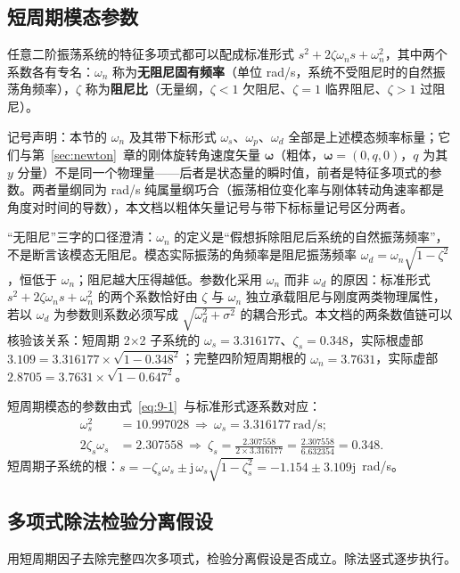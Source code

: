 \documentclass[11pt,a4paper]{ctexart}
\newcommand{\bvec}[1]{\boldsymbol{#1}}
\begin{document}
\subsection{短周期模态参数}

任意二阶振荡系统的特征多项式都可以配成标准形式 $s^2+2\zeta\omega_n s+\omega_n^2$，其中两个系数各有专名：$\omega_n$ 称为\textbf{无阻尼固有频率}（单位 rad/s，系统不受阻尼时的自然振荡角频率），$\zeta$ 称为\textbf{阻尼比}（无量纲，$\zeta<1$ 欠阻尼、$\zeta=1$ 临界阻尼、$\zeta>1$ 过阻尼）。

记号声明：本节的 $\omega_n$ 及其带下标形式 $\omega_s$、$\omega_p$、$\omega_d$ 全部是上述模态频率标量；它们与第~\ref{sec:newton}~章的刚体旋转角速度矢量 $\bvec{\omega}$（粗体，$\bvec{\omega}=(0,q,0)$，$q$ 为其 $y$ 分量）不是同一个物理量——后者是状态量的瞬时值，前者是特征多项式的参数。两者量纲同为 rad/s 纯属量纲巧合（振荡相位变化率与刚体转动角速率都是角度对时间的导数），本文档以粗体矢量记号与带下标标量记号区分两者。

``无阻尼''三字的口径澄清：$\omega_n$ 的定义是``假想拆除阻尼后系统的自然振荡频率''，不是断言该模态无阻尼。模态实际振荡的角频率是阻尼振荡频率 $\omega_d=\omega_n\sqrt{1-\zeta^2}$，恒低于 $\omega_n$；阻尼越大压得越低。参数化采用 $\omega_n$ 而非 $\omega_d$ 的原因：标准形式 $s^2+2\zeta\omega_n s+\omega_n^2$ 的两个系数恰好由 $\zeta$ 与 $\omega_n$ 独立承载阻尼与刚度两类物理属性，若以 $\omega_d$ 为参数则系数必须写成 $\sqrt{\omega_d^2+\sigma^2}$ 的耦合形式。本文档的两条数值链可以核验该关系：短周期 2$\times$2 子系统的 $\omega_s=3.316177$、$\zeta_s=0.348$，实际根虚部 $3.109=3.316177\times\sqrt{1-0.348^2}$；完整四阶短周期根的 $\omega_n=3.7631$，实际虚部 $2.8705=3.7631\times\sqrt{1-0.647^2}$。

短周期模态的参数由式~\eqref{eq:9-1}~与标准形式逐系数对应：
\begin{align*}
\omega_s^2 &= 10.997028 \ \Longrightarrow\ \omega_s = 3.316177\ \mathrm{rad/s};\\
2\zeta_s\omega_s &= 2.307558 \ \Longrightarrow\ \zeta_s = \frac{2.307558}{2\times 3.316177} = \frac{2.307558}{6.632354} = 0.348.
\end{align*}
短周期子系统的根：$s = -\zeta_s\omega_s \pm \mathrm{j}\,\omega_s\sqrt{1-\zeta_s^2} = -1.154\pm 3.109\mathrm{j}$~rad/s。

\subsection{多项式除法检验分离假设}

用短周期因子去除完整四次多项式，检验分离假设是否成立。除法竖式逐步执行。
\end{document}
